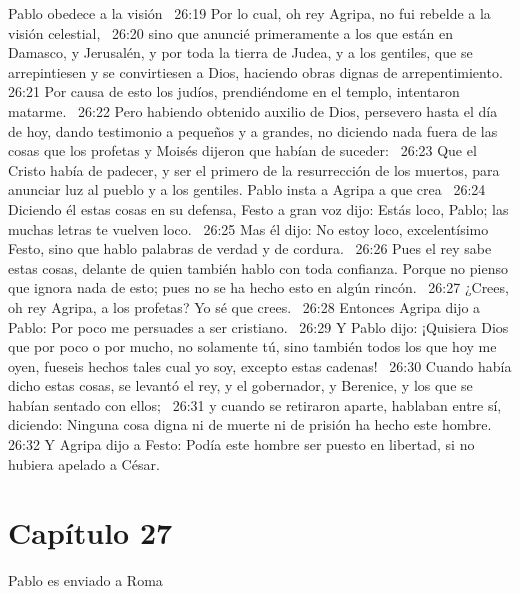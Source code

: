 Pablo obedece a la visión  
26:19 Por lo cual, oh rey Agripa, no fui rebelde a la visión celestial,  
26:20 sino que anuncié primeramente a los que están en Damasco, y Jerusalén, y por toda la tierra de Judea, y a los gentiles, que se arrepintiesen y se convirtiesen a Dios, haciendo obras dignas de arrepentimiento.  
26:21 Por causa de esto los judíos, prendiéndome en el templo, intentaron matarme.  
26:22 Pero habiendo obtenido auxilio de Dios, persevero hasta el día de hoy, dando testimonio a pequeños y a grandes, no diciendo nada fuera de las cosas que los profetas y Moisés dijeron que habían de suceder:  
26:23 Que el Cristo había de padecer, y ser el primero de la resurrección de los muertos, para anunciar luz al pueblo y a los gentiles. 
Pablo insta a Agripa a que crea  
26:24 Diciendo él estas cosas en su defensa, Festo a gran voz dijo: Estás loco, Pablo; las muchas letras te vuelven loco.  
26:25 Mas él dijo: No estoy loco, excelentísimo Festo, sino que hablo palabras de verdad y de cordura.  
26:26 Pues el rey sabe estas cosas, delante de quien también hablo con toda confianza. Porque no pienso que ignora nada de esto; pues no se ha hecho esto en algún rincón.  
26:27 ¿Crees, oh rey Agripa, a los profetas? Yo sé que crees.  
26:28 Entonces Agripa dijo a Pablo: Por poco me persuades a ser cristiano.  
26:29 Y Pablo dijo: ¡Quisiera Dios que por poco o por mucho, no solamente tú, sino también todos los que hoy me oyen, fueseis hechos tales cual yo soy, excepto estas cadenas!  
26:30 Cuando había dicho estas cosas, se levantó el rey, y el gobernador, y Berenice, y los que se habían sentado con ellos;  
26:31 y cuando se retiraron aparte, hablaban entre sí, diciendo: Ninguna cosa digna ni de muerte ni de prisión ha hecho este hombre.  
26:32 Y Agripa dijo a Festo: Podía este hombre ser puesto en libertad, si no hubiera apelado a César.  
\section*{Capítulo 27}
Pablo es enviado a Roma  

